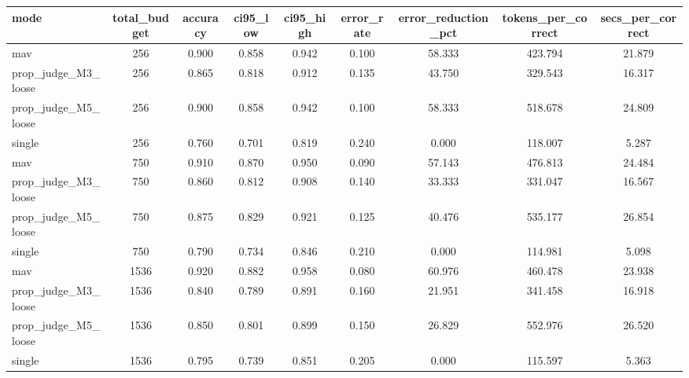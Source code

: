 \begin{tabular}{lcccccccc}
\toprule
mode & total\_budget & accuracy & ci95\_low & ci95\_high & error\_rate & error\_reduction\_pct & tokens\_per\_correct & secs\_per\_correct \\
\midrule
mav & 256 & 0.900 & 0.858 & 0.942 & 0.100 & 58.333 & 423.794 & 21.879 \\
prop\_judge\_M3\_loose & 256 & 0.865 & 0.818 & 0.912 & 0.135 & 43.750 & 329.543 & 16.317 \\
prop\_judge\_M5\_loose & 256 & 0.900 & 0.858 & 0.942 & 0.100 & 58.333 & 518.678 & 24.809 \\
single & 256 & 0.760 & 0.701 & 0.819 & 0.240 & 0.000 & 118.007 & 5.287 \\
mav & 750 & 0.910 & 0.870 & 0.950 & 0.090 & 57.143 & 476.813 & 24.484 \\
prop\_judge\_M3\_loose & 750 & 0.860 & 0.812 & 0.908 & 0.140 & 33.333 & 331.047 & 16.567 \\
prop\_judge\_M5\_loose & 750 & 0.875 & 0.829 & 0.921 & 0.125 & 40.476 & 535.177 & 26.854 \\
single & 750 & 0.790 & 0.734 & 0.846 & 0.210 & 0.000 & 114.981 & 5.098 \\
mav & 1536 & 0.920 & 0.882 & 0.958 & 0.080 & 60.976 & 460.478 & 23.938 \\
prop\_judge\_M3\_loose & 1536 & 0.840 & 0.789 & 0.891 & 0.160 & 21.951 & 341.458 & 16.918 \\
prop\_judge\_M5\_loose & 1536 & 0.850 & 0.801 & 0.899 & 0.150 & 26.829 & 552.976 & 26.520 \\
single & 1536 & 0.795 & 0.739 & 0.851 & 0.205 & 0.000 & 115.597 & 5.363 \\
\bottomrule
\end{tabular}

